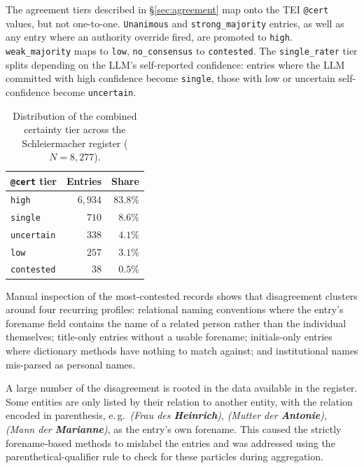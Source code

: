 \documentclass{eceasst}
\newcommand{\eg}{e.\,g.}
\begin{document}
The agreement tiers described in \S\ref{sec:agreement} map onto the TEI \texttt{@cert} values, but not one-to-one. \texttt{Unanimous} and \texttt{strong\_majority} entries, as well as any entry where an authority override fired, are promoted to \texttt{high}. \texttt{weak\_majority} maps to \texttt{low}, \texttt{no_consensus} to \texttt{contested}. The \texttt{single_rater} tier splits depending on the LLM's self-reported confidence: entries where the LLM committed with high confidence become \texttt{single}, those with low or uncertain self-confidence become \texttt{uncertain}.

\begin{table}[h]
  \centering
  \small
  \begin{tabular}{lrr}
    \toprule
    \texttt{@cert} tier & Entries & Share \\
    \midrule
    \texttt{high}      & $6{,}934$ & $83.8\%$ \\
    \texttt{single}    & $710$     & $8.6\%$  \\
    \texttt{uncertain} & $338$     & $4.1\%$  \\
    \texttt{low}       & $257$     & $3.1\%$  \\
    \texttt{contested} & $38$      & $0.5\%$  \\
    \bottomrule
  \end{tabular}
  \caption{Distribution of the combined certainty tier across the Schleiermacher register ($N = 8{,}277$).}
  \label{tab:cert-tiers}
\end{table}

Manual inspection of the most-contested records shows that disagreement clusters around four recurring profiles: relational naming conventions where the entry's forename field contains the name of a related person rather than the individual themselves; title-only entries without a usable forename; initials-only entries where dictionary methods have nothing to match against; and institutional names mis-parsed as personal names.


A large number of the disagreement is rooted in the data available in the register. Some entities are only listed by their relation to another entity, with the relation encoded in parenthesis, \eg{~\emph{(Frau des \textbf{Heinrich})}, \emph{(Mutter der \textbf{Antonie})}, \emph{(Mann der \textbf{Marianne})}}, as the entry's own forename. This caused the strictly forename-based methods to mislabel the entries and was addressed using the parenthetical-qualifier rule to check for these particles during aggregation.
\end{document}
